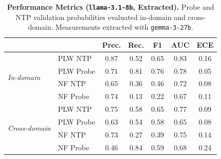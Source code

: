 \begin{table}[ht]
\centering
\begin{tabular}{ll ccccc}
\toprule
& & Prec. & Rec. & F1 & AUC & ECE \\
\midrule
\multirow{4}{*}{\textit{In-domain}}
& PLW NTP & 0.87 & 0.52 & 0.65 & 0.83 & 0.16 \\
& PLW Probe & 0.71 & 0.81 & 0.76 & 0.78 & 0.05 \\
& NF NTP & 0.65 & 0.36 & 0.46 & 0.72 & 0.08 \\
& NF Probe & 0.74 & 0.13 & 0.22 & 0.67 & 0.11 \\
\midrule
\multirow{4}{*}{\textit{Cross-domain}}
& PLW NTP & 0.75 & 0.58 & 0.65 & 0.77 & 0.09 \\
& PLW Probe & 0.63 & 0.54 & 0.58 & 0.65 & 0.08 \\
& NF NTP & 0.73 & 0.27 & 0.39 & 0.75 & 0.14 \\
& NF Probe & 0.46 & 0.84 & 0.59 & 0.68 & 0.24 \\
\bottomrule
\end{tabular}
\caption{\textbf{Performance Metrics (\texttt{llama-3.1-8b}, Extracted).} Probe and NTP validation probabilities evaluated in-domain and cross-domain. Measurements extracted with \texttt{gemma-3-27b}.}
\label{tab:llama-3.1-8b-gemma-3-27b-head-real}
\end{table}

